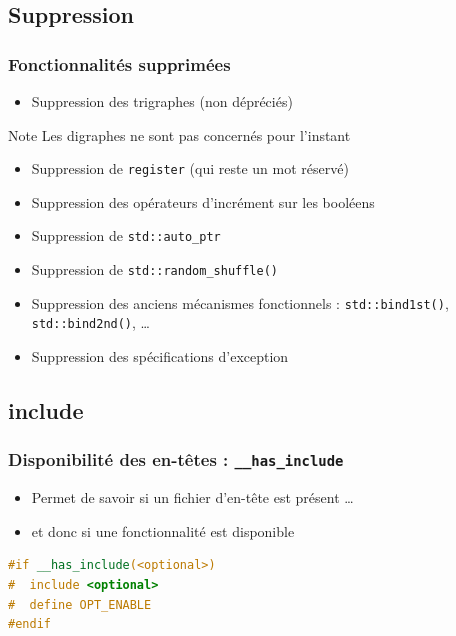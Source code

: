 \documentclass[C++.tex]{subfiles}
\begin{document}
\subsection*{Suppression}
\begin{frame}[fragile]
	\frametitle{Fonctionnalités supprimées}
	\begin{itemize}
		\item Suppression des trigraphes (non dépréciés)
	\end{itemize}

	\begin{block}{Note}
		Les digraphes ne sont pas concernés pour l'instant
	\end{block}

	\begin{itemize}
		\item Suppression de \lstinline|register| (qui reste un mot réservé)
		\item Suppression des opérateurs d'incrément sur les booléens


		\item Suppression de \lstinline|std::auto_ptr|
		\item Suppression de \lstinline|std::random_shuffle()|
		\item Suppression des anciens mécanismes fonctionnels : \lstinline|std::bind1st()|, \lstinline|std::bind2nd()|, \ldots
		\item Suppression des spécifications d'exception
	\end{itemize}
		
\end{frame}

\subsection*{include}
\begin{frame}[fragile]
	\frametitle{Disponibilité des en-têtes : \lstinline|__has_include|}
	\begin{itemize}
		\item Permet de savoir si un fichier d'en-tête est présent \ldots
		\item et donc si une fonctionnalité est disponible
	\end{itemize}

	\begin{lstlisting}[language=C++]
#if __has_include(<optional>)
#  include <optional>
#  define OPT_ENABLE
#endif\end{lstlisting}
\end{frame}
\end{document}
